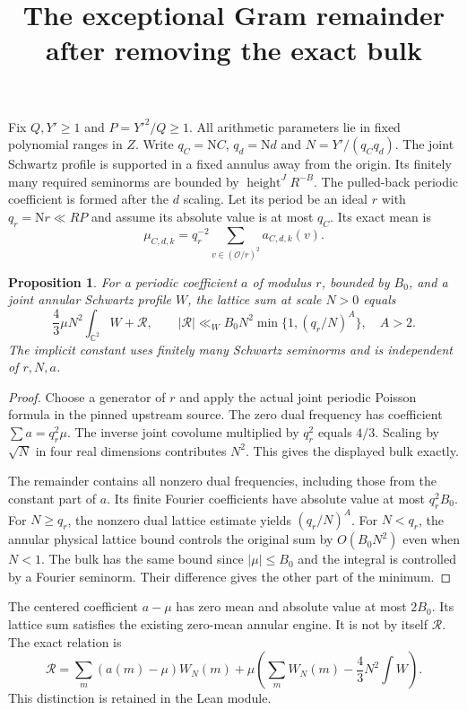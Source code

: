 \documentclass[11pt]{article}
\newtheorem{proposition}{Proposition}
\newcommand{\Nm}{\mathrm{N}}
\begin{document}
\title{The exceptional Gram remainder after removing the exact bulk}
\author{}
\date{}
\maketitle

Fix $Q,Y'\geq1$ and $P=Y'^2/Q\geq1$. All arithmetic parameters lie in
fixed polynomial ranges in $Z$. Write $q_C=\Nm C$, $q_d=\Nm d$ and
$N=Y'/(q_Cq_d)$. The joint Schwartz profile is supported in a fixed
annulus away from the origin. Its finitely many required seminorms are
bounded by $\operatorname{height}^{J}R^{-B}$. The pulled-back periodic
coefficient is formed after the $d$ scaling. Let its period be an ideal
$r$ with $q_r=\Nm r\ll RP$ and assume its absolute value is at most
$q_C$. Its exact mean is
\[
 \mu_{C,d,k}=q_r^{-2}\sum_{v\in(\mathcal O/r)^2}a_{C,d,k}(v).
\]

\begin{proposition}
For a periodic coefficient $a$ of modulus $r$, bounded by $B_0$, and
a joint annular Schwartz profile $W$, the lattice sum at scale $N>0$
equals
\[
 \frac43\mu N^2\int_{\mathbb C^2}W+\mathcal R,
 \qquad
 |\mathcal R|\ll_W B_0N^2
   \min\{1,(q_r/N)^A\},\quad A>2.
\]
The implicit constant uses finitely many Schwartz seminorms and is
independent of $r,N,a$.
\end{proposition}

\begin{proof}
Choose a generator of $r$ and apply the actual joint periodic Poisson
formula in the pinned upstream source. The zero dual frequency has
coefficient $\sum a=q_r^2\mu$. The inverse joint covolume multiplied
by $q_r^2$ equals $4/3$. Scaling by $\sqrt N$ in four real dimensions
contributes $N^2$. This gives the displayed bulk exactly.

The remainder contains all nonzero dual frequencies, including those
from the constant part of $a$. Its finite Fourier coefficients have
absolute value at most $q_r^2B_0$. For $N\geq q_r$, the nonzero dual
lattice estimate yields $(q_r/N)^A$. For $N<q_r$, the annular physical
lattice bound controls the original sum by $O(B_0N^2)$ even when
$N<1$. The bulk has the same bound since $|\mu|\leq B_0$ and the
integral is controlled by a Fourier seminorm. Their difference gives
the other part of the minimum.
\end{proof}

The centered coefficient $a-\mu$ has zero mean and absolute value at
most $2B_0$. Its lattice sum satisfies the existing zero-mean annular
engine. It is not by itself $\mathcal R$. The exact relation is
\[
 \mathcal R=\sum_m(a(m)-\mu)W_N(m)
 +\mu\left(\sum_mW_N(m)-\frac43N^2\int W\right).
\]
This distinction is retained in the Lean module.
\end{document}
